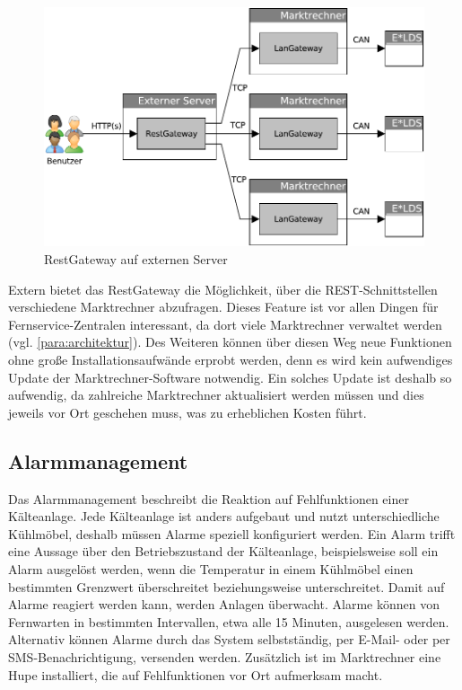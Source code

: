 \documentclass[11pt,a4paper]{report}
\begin{document}
\begin{figure}[htbp]
\centering
\includegraphics[scale=0.7]{images/RestGateway_extern.pdf}
\caption[]{RestGateway auf externen Server}
\label{fig:rest_extern}
\end{figure}

Extern bietet das RestGateway die Möglichkeit, über die REST-Schnittstellen verschiedene Marktrechner abzufragen. Dieses Feature ist vor allen Dingen für Fernservice-Zentralen interessant, da dort viele Marktrechner verwaltet werden (vgl. \ref{para:architektur}). Des Weiteren können über diesen Weg neue Funktionen ohne große Installationsaufwände erprobt werden, denn es wird kein aufwendiges Update der Marktrechner-Software notwendig. Ein solches Update ist deshalb so aufwendig, da zahlreiche Marktrechner aktualisiert werden müssen und dies jeweils vor Ort geschehen muss, was zu erheblichen Kosten führt.

\subsection{Alarmmanagement} 

Das Alarmmanagement beschreibt die Reaktion auf Fehlfunktionen einer Kälteanlage. Jede Kälteanlage ist anders aufgebaut und nutzt unterschiedliche Kühlmöbel, deshalb müssen Alarme speziell konfiguriert werden. Ein Alarm trifft eine Aussage über den Betriebszustand der Kälteanlage, beispielsweise soll ein Alarm ausgelöst werden, wenn die Temperatur in einem Kühlmöbel einen bestimmten Grenzwert überschreitet beziehungsweise unterschreitet. Damit auf Alarme reagiert werden kann, werden Anlagen überwacht. Alarme können von Fernwarten in bestimmten Intervallen, etwa alle 15 Minuten, ausgelesen werden. Alternativ können Alarme durch das System selbstständig, per E-Mail- oder per SMS-Benachrichtigung, versenden werden. Zusätzlich ist im Marktrechner eine Hupe installiert, die auf Fehlfunktionen vor Ort aufmerksam macht. 
\end{document}

